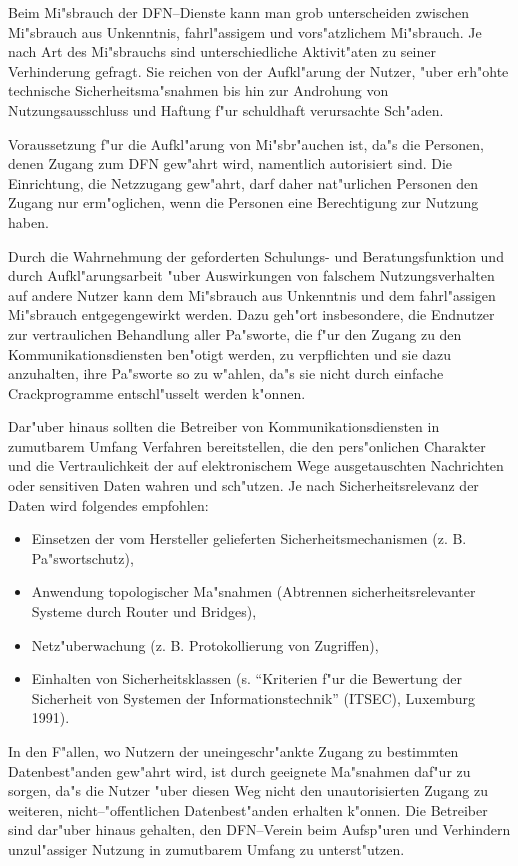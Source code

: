Beim Mi"sbrauch der DFN--Dienste kann man grob unterscheiden zwischen
Mi"sbrauch aus Unkenntnis, fahrl"assigem und vors"atzlichem Mi"sbrauch. Je nach
Art des Mi"sbrauchs sind unterschiedliche Aktivit"aten zu seiner Verhinderung
gefragt. Sie reichen von der Aufkl"arung der Nutzer, "uber erh"ohte technische
Sicherheitsma"snahmen bis hin zur Androhung von Nutzungsausschluss und Haftung
f"ur schuldhaft verursachte Sch"aden.

Voraussetzung f"ur die Aufkl"arung von Mi"sbr"auchen ist, da"s die Personen,
denen Zugang zum DFN gew"ahrt wird, namentlich autorisiert sind. Die
Einrichtung, die Netzzugang gew"ahrt, darf daher nat"urlichen Personen den
Zugang nur erm"oglichen, wenn die Personen eine Berechtigung zur Nutzung
haben.

Durch die Wahrnehmung der geforderten Schulungs- und Beratungsfunktion und
durch Aufkl"arungsarbeit "uber Auswirkungen von falschem Nutzungsverhalten auf
andere Nutzer kann dem Mi"sbrauch aus Unkenntnis und dem fahrl"assigen
Mi"sbrauch entgegengewirkt werden. Dazu geh"ort insbesondere, die Endnutzer
zur vertraulichen Behandlung aller Pa"sworte, die f"ur den Zugang zu den
Kommunikationsdiensten ben"otigt werden, zu verpflichten und sie dazu
anzuhalten, ihre Pa"sworte so zu w"ahlen, da"s sie nicht durch einfache
Crackprogramme entschl"usselt werden k"onnen.

Dar"uber hinaus sollten die Betreiber von Kommunikationsdiensten in
zumutbarem Umfang Verfahren bereitstellen, die den pers"onlichen Charakter
und die Vertraulichkeit der auf elektronischem Wege ausgetauschten
Nachrichten oder sensitiven Daten wahren und sch"utzen. Je nach
Sicherheitsrelevanz der Daten wird folgendes empfohlen:

\begin{itemize}
  \item Einsetzen der vom Hersteller gelieferten Sicherheitsmechanismen (z. B.
    Pa"swortschutz),
  \item Anwendung topologischer Ma"snahmen (Abtrennen sicherheitsrelevanter
    Systeme durch Router und Bridges),
  \item Netz"uberwachung (z. B. Protokollierung von Zugriffen),
  \item Einhalten von Sicherheitsklassen (s. "`Kriterien f"ur die Bewertung der
    Sicherheit von Systemen der Informationstechnik"' (ITSEC), Luxemburg
    1991).
\end{itemize}

In den F"allen, wo Nutzern der uneingeschr"ankte Zugang zu bestimmten
Datenbest"anden gew"ahrt wird, ist durch geeignete Ma"snahmen daf"ur zu sorgen,
da"s die Nutzer "uber diesen Weg nicht den unautorisierten Zugang zu
weiteren, nicht--"offentlichen Datenbest"anden erhalten k"onnen. Die Betreiber
sind dar"uber hinaus gehalten, den DFN--Verein beim Aufsp"uren und Verhindern
unzul"assiger Nutzung in zumutbarem Umfang zu unterst"utzen.

